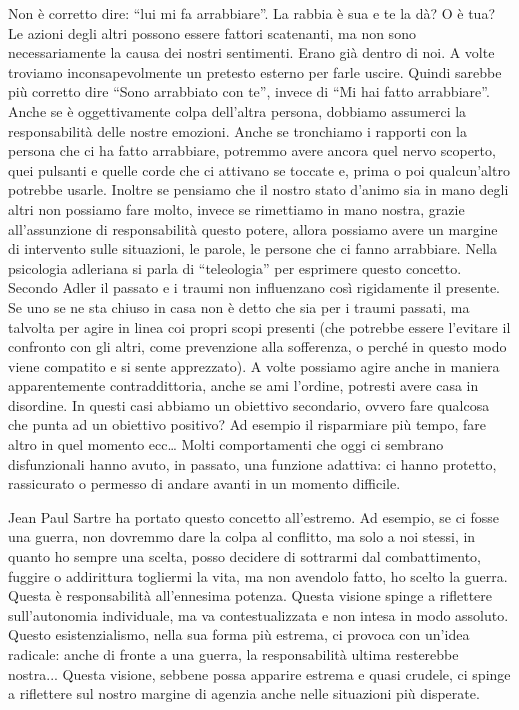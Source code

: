 \documentclass[12pt]{book} %
\begin{document}
Non è corretto dire: “lui mi fa arrabbiare”. La rabbia è sua e te la dà? O è tua? Le azioni degli altri possono essere fattori scatenanti, ma non sono necessariamente la causa dei nostri sentimenti. Erano già dentro di noi. A volte troviamo inconsapevolmente un pretesto esterno per farle uscire. Quindi sarebbe più corretto dire “Sono arrabbiato con te”, invece
di “Mi hai fatto arrabbiare”. Anche se è oggettivamente colpa dell'altra persona, dobbiamo assumerci la responsabilità delle nostre emozioni. Anche se tronchiamo i rapporti con la persona che ci ha fatto arrabbiare, potremmo avere ancora quel nervo scoperto, quei pulsanti e quelle corde che ci attivano se toccate e, prima o poi qualcun'altro potrebbe usarle. Inoltre se pensiamo che il nostro stato d'animo sia in mano degli altri non possiamo fare molto, invece se rimettiamo in mano nostra, grazie all'assunzione di responsabilità questo potere, allora possiamo avere un margine di intervento sulle situazioni, le parole, le persone che ci fanno arrabbiare.
Nella psicologia adleriana si parla di “teleologia” per esprimere questo concetto.
Secondo Adler il passato e i traumi non influenzano così rigidamente il presente. Se uno se ne sta chiuso in casa non è detto che sia per i traumi
passati, ma talvolta per agire in linea coi propri scopi presenti (che potrebbe essere l'evitare il confronto
con gli altri, come prevenzione alla sofferenza, o perché in questo modo viene compatito e si sente apprezzato).
A volte possiamo agire anche in maniera apparentemente contraddittoria, anche se ami l'ordine, potresti avere casa in disordine. In questi casi abbiamo un obiettivo secondario, ovvero fare qualcosa che punta ad un obiettivo positivo? Ad esempio il risparmiare più tempo, fare altro in quel momento ecc…
Molti comportamenti che oggi ci sembrano disfunzionali hanno avuto, in passato, una funzione adattiva: ci hanno protetto, rassicurato o permesso di andare avanti in un momento difficile.

Jean Paul Sartre ha portato questo concetto all'estremo. Ad esempio, se ci fosse una guerra, non dovremmo dare la colpa al conflitto, ma solo a noi stessi, in quanto ho sempre una scelta, posso decidere di sottrarmi
dal combattimento, fuggire o addirittura togliermi la vita, ma non avendolo fatto, ho scelto la guerra. Questa è
responsabilità all'ennesima potenza. Questa visione spinge a riflettere sull’autonomia individuale, ma va contestualizzata e non intesa in modo assoluto.
Questo esistenzialismo, nella sua forma più estrema, ci provoca con un'idea radicale: anche di fronte a una guerra, la responsabilità ultima resterebbe nostra... Questa visione, sebbene possa apparire estrema e quasi crudele, ci spinge a riflettere sul nostro margine di agenzia anche nelle situazioni più disperate.
\end{document}
